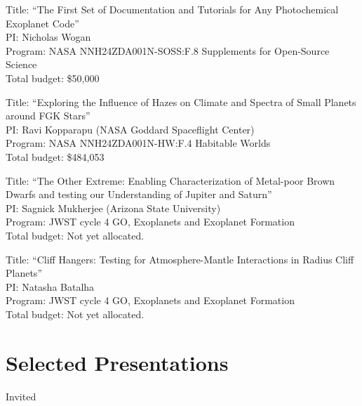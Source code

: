 \documentclass[12pt]{article}
\begin{document}
\begin{cvlist}
\item[2025 - 2026]
  Title: ``The First Set of Documentation and Tutorials for Any Photochemical Exoplanet Code''\\
  PI: Nicholas Wogan\\
  Program: NASA NNH24ZDA001N-SOSS:F.8 Supplements for Open-Source Science\\
  Total budget: \$50,000
\item[2025 - 2028]
  Title: ``Exploring the Influence of Hazes on Climate and Spectra of Small Planets around FGK Stars''\\
  PI: Ravi Kopparapu (NASA Goddard Spaceflight Center)\\
  Program: NASA NNH24ZDA001N-HW:F.4 Habitable Worlds\\
  Total budget: \$484,053
\item[2025 - 2028]
  Title: ``The Other Extreme: Enabling Characterization of Metal-poor Brown Dwarfs and testing our Understanding of Jupiter and Saturn''\\
  PI: Sagnick Mukherjee (Arizona State University)\\
  Program: JWST cycle 4 GO, Exoplanets and Exoplanet Formation\\
  Total budget: Not yet allocated.
\item[2025 - 2028]
  Title: ``Cliff Hangers: Testing for Atmosphere-Mantle Interactions in Radius Cliff Planets''\\
  PI: Natasha Batalha\\
  Program: JWST cycle 4 GO, Exoplanets and Exoplanet Formation\\
  Total budget: Not yet allocated.
\end{cvlist}

\section{Selected Presentations}

\noindent Invited
\end{document}
